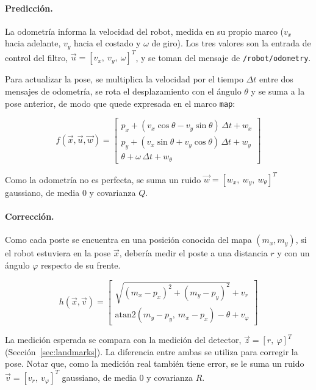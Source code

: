 \documentclass[11pt,a4paper]{article}
\begin{document}
\paragraph{Predicción.} La odometría informa la velocidad del robot, medida en su propio marco ($v_x$ hacia adelante, $v_y$ hacia el costado y $\omega$ de giro). Los tres valores son la entrada de control del filtro, $\vec{u} = [v_x,\ v_y,\ \omega]^T$, y se toman del mensaje de \texttt{/robot/odometry}. 

Para actualizar la pose, se multiplica la velocidad por el tiempo $\Delta t$ entre dos mensajes de odometría, se rota el desplazamiento con el ángulo $\theta$ y se suma a la pose anterior, de modo que quede expresada en el marco \texttt{map}:

\begin{equation}
f(\vec{x},\vec{u},\vec{w}) =
\begin{bmatrix}
p_x + (v_x\cos\theta - v_y\sin\theta)\,\Delta t + w_x \\
p_y + (v_x\sin\theta + v_y\cos\theta)\,\Delta t + w_y \\
\theta + \omega\,\Delta t + w_\theta
\end{bmatrix}
\end{equation}

Como la odometría no es perfecta, se suma un ruido $\vec{w} = [w_x,\ w_y,\ w_\theta]^T$ gaussiano, de media 0 y covarianza $Q$.

\paragraph{Corrección.} Como cada poste se encuentra en una posición conocida del mapa $(m_x, m_y)$, si el robot estuviera en la pose $\vec{x}$, debería medir el poste a una distancia $r$ y con un ángulo $\varphi$ respecto de su frente.

\begin{equation}
h(\vec{x},\vec{v}) =
\begin{bmatrix}
\sqrt{(m_x - p_x)^2 + (m_y - p_y)^2} + v_r \\
\mathrm{atan2}(m_y - p_y,\ m_x - p_x) - \theta + v_\varphi
\end{bmatrix}
\end{equation}

La medición esperada se compara con la medición del detector, $\vec{z} = [r,\ \varphi]^T$ (Sección~\ref{sec:landmarks}). La diferencia entre ambas se utiliza para corregir la pose. Notar que, como la medición real también tiene error, se le suma un ruido $\vec{v} = [v_r,\ v_\varphi]^T$ gaussiano, de media 0 y covarianza $R$.
\end{document}
